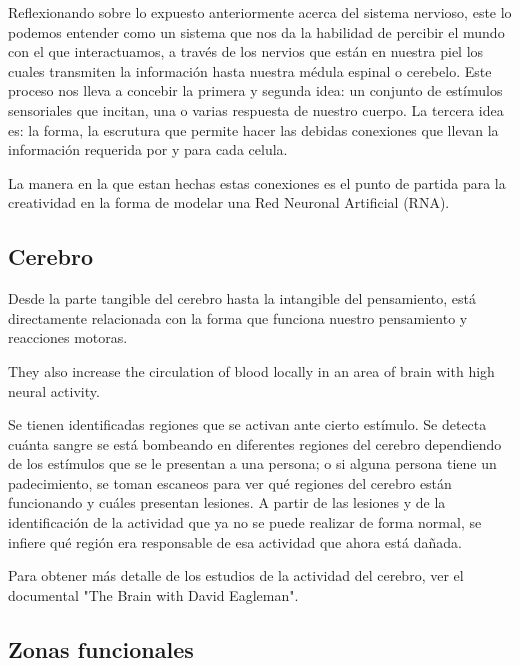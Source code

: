 Reflexionando sobre lo expuesto anteriormente acerca del sistema nervioso,
este lo podemos entender como un sistema que nos da la habilidad de percibir el mundo con el que interactuamos, a través de los nervios que están en nuestra piel los cuales transmiten la información hasta nuestra médula espinal o cerebelo. Este proceso nos lleva a concebir la primera y segunda idea: un conjunto de estímulos sensoriales que incitan, una o varias respuesta de nuestro cuerpo. La tercera idea es: la forma, la escrutura que permite hacer las debidas conexiones que llevan la información requerida por y para cada celula.

La manera en la que estan hechas estas conexiones es el punto de partida para la creatividad en la forma de modelar una Red Neuronal Artificial (RNA).

\subsection{Cerebro}

Desde la parte tangible del cerebro hasta la intangible del pensamiento, está directamente relacionada con la forma que funciona nuestro pensamiento y reacciones motoras.



They also increase the circulation of blood locally in an area of brain with high
neural activity.

Se tienen identificadas regiones que se activan ante cierto estímulo.\cite{neurona_A_cerebro} Se detecta cuánta sangre se está bombeando en diferentes regiones del cerebro dependiendo de los estímulos que se le presentan a una persona; o si alguna persona tiene un padecimiento, se toman escaneos para ver qué regiones del cerebro están funcionando y cuáles presentan lesiones. A partir de las lesiones y de la identificación de la actividad que ya no se puede realizar de forma normal, se infiere qué región era responsable de esa actividad que ahora está dañada.\cite{estudiosF}

Para obtener más detalle de los estudios de la actividad del cerebro, ver el documental "The Brain with David Eagleman".

\subsection{Zonas funcionales}

